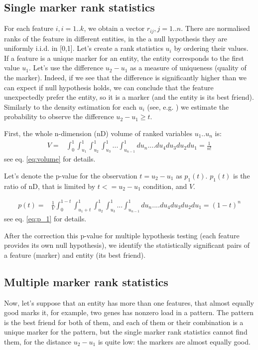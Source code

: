 \documentclass{llncs}
\begin{document}
\subsection{Single marker rank statistics}
For each feature $i,i=1..k$, we obtain a vector $r_{ij}, j=1..n$. There are normalised ranks of the feature in different entities, in the a null hypothesis they are uniformly i.i.d. in [0,1]. Let's create a rank statistics $u_i$ by ordering their values. If a feature is a unique marker for an entity, the entity corresponds to the first  value $u_1$. Let's use the difference $u_2-u_1$ as a measure of uniqueness (quality of the marker). Indeed, if we see that the difference is significantly higher than we can expect if null hypothesis holds, we can conclude that the feature unexpectedly prefer the entity, so it is a marker (and the entity is its best friend). Similarly to the density estimation for each $u_i$ (see, e.g. \cite{Gut:2009}) we estimate the probability to observe the difference $u_2 - u_1 \ge t$. 

First, the whole n-dimension (nD) volume of ranked variables $u_1 .. u_n$ is:
\begin{eqnarray*}
V = &\displaystyle \int_0^1\int_{u_1}^1\int_{u_2}^1\int_{u_3}^1...\int_{u_{n-1}}^1 du_n....du_4 du_3 du_2 du_1 =  \frac{1}{n!}
\end{eqnarray*}
see eq. \ref{eq:volume} for details.

Let's denote the p-value for the observation $t=u_2-u_1$ as $p_1(t)$. $p_1(t)$ is the ratio of nD, that is limited by $t<=u_2-u_1$ condition, and $V$.

\begin{eqnarray*}
p(t) = & \displaystyle\frac{1}{V} \displaystyle \int_0^{1-t}\int_{{u_1}+t}^1\int_{u_2}^1\int_{u_3}^1...\int_{u_{n-1}}^1 du_n....du_4 du_3 du_2 du_1 = (1-t)^n
\end{eqnarray*}
see eq. \ref{eq:p_1} for details.

After the correction this p-value for multiple hypothesis testing (each feature provides its own null hypothesis), we identify the statistically significant pairs of a feature (marker) and entity (its best friend).

\subsection{Multiple marker rank statistics}
Now, let's suppose that an entity has more than one features, that almost equally good marks it, for example, two genes has nonzero load in a pattern. The pattern is the best friend for both of them, and each of them or their combination is a unique marker for the pattern, but the single marker rank statistics cannot find them, for the distance $u_2-u_1$ is quite low: the markers are almost equally good.
\end{document}

